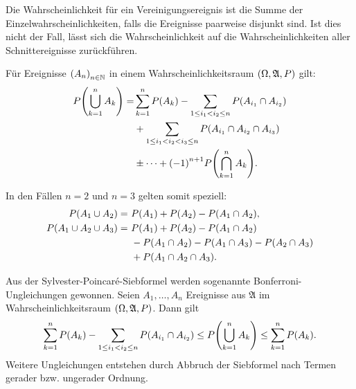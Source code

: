 \documentclass{lecture}
\begin{document}
    Die Wahrscheinlichkeit für ein Vereinigungsereignis ist die Summe der Einzelwahrscheinlichkeiten, falls die Ereignisse paarweise disjunkt sind.
    Ist dies nicht der Fall, lässt sich die Wahrscheinlichkeit auf die Wahrscheinlichkeiten aller Schnittereignisse zurückführen.

    \begin{lemma}
        Für Ereignisse \(\parentheses*{A_n}_{n \in \N}\) in einem Wahrscheinlichkeitsraum \(\parentheses*{\Omega, \mathfrak{A}, P}\) gilt:
        \begin{align*}
            P\parentheses*{\bigcup_{k = 1}^n A_k} = &\sum_{k = 1}^n P\parentheses*{A_k} - \sum_{1 \le i_1 < i_2 \le n} P\parentheses*{A_{i_1} \cap A_{i_2}}\\
            &+ \sum_{1 \le i_1 < i_2 < i_3 \le n}P\parentheses*{A_{i_1} \cap A_{i_2} \cap A_{i_3}}\\
            &\pm \cdots + \parentheses*{-1}^{n + 1}P\parentheses*{\bigcap_{k = 1}^n A_k}.
        \end{align*}
    \end{lemma}
    In den Fällen \(n = 2\) und \(n = 3\) gelten somit speziell:
    \begin{align*}
        P\parentheses*{A_1 \cup A_2} =\ &P\parentheses*{A_1} + P\parentheses*{A_2} - P\parentheses*{A_1 \cap A_2},\\
        P\parentheses*{A_1 \cup A_2 \cup A_3} =\ &P\parentheses*{A_1} + P\parentheses*{A_2} - P\parentheses*{A_1 \cap A_2}\\
        &- P\parentheses*{A_1 \cap A_2} - P\parentheses*{A_1 \cap A_3} - P\parentheses*{A_2 \cap A_3}\\
        &+ P\parentheses*{A_1 \cap A_2 \cap A_3}.
    \end{align*}

    \begin{remark}
        Aus der Sylvester-Poincaré-Siebformel werden sogenannte Bonferroni-Ungleichungen gewonnen.
        Seien \(A_1, \ldots, A_n\) Ereignisse aus \(\mathfrak{A}\) im Wahrscheinlichkeitsraum \(\parentheses*{\Omega, \mathfrak{A}, P}\).
        Dann gilt
        \[
            \sum_{k = 1}^n P\parentheses*{A_k} - \sum_{1 \le i_1 < i_2 \le n}P\parentheses*{A_{i_1} \cap A_{i_2}} \le P\parentheses*{\bigcup_{k = 1}^n A_k} \le \sum_{k = 1}^n P\parentheses*{A_k}.
        \]
        Weitere Ungleichungen entstehen durch Abbruch der Siebformel nach Termen gerader bzw. ungerader Ordnung.
    \end{remark}
\end{document}
